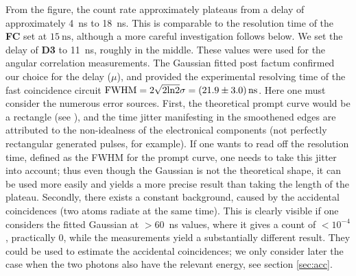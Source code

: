 \documentclass[twocolumn]{article}
\begin{document}
From the figure, the count rate approximately plateaus from a delay of approximately 4~ns to 18~ns. This is comparable to the resolution time of the \textbf{FC} set at $\SI{15}{\nano\second}$, although a more careful investigation follows below. We set the delay of \textbf{D3} to 11~ns, roughly in the middle. These values were used for the angular correlation measurements. The Gaussian fitted post factum confirmed our choice for the delay ($\mu$), and provided the experimental resolving time of the fast coincidence circuit  $\text{FWHM} = 2 \sqrt{2 \text{ln}2} \sigma = \SI[separate-uncertainty = true]{21.9 \pm 3.0}{\nano \second}$\cite{signal}. Here one must consider the numerous error sources. First, the theoretical prompt curve would be a rectangle (see \cite{leo}), and the time jitter manifesting in the smoothened edges are attributed to the non-idealness of the electronical components (not perfectly rectangular generated pulses, for example). If one wants to read off the resolution time, defined as the FWHM for the prompt curve, one needs to take this jitter into account; thus even though the Gaussian is not the theoretical shape, it can be used more easily and yields a more precise result than taking the length of the plateau. Secondly, there exists a constant background, caused by the accidental coincidences (two atoms radiate at the same time). This is clearly visible if one considers the fitted Gaussian at $>60$~ns values, where it gives a count of $<10^{-4}$, practically 0, while the measurements yield a substantially different result. They could be used to estimate the accidental coincidences; we only consider later the case when the two photons also have the relevant energy, see section \ref{sec:acc}.
\end{document}
